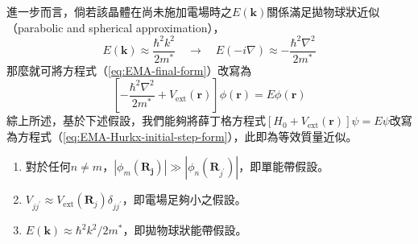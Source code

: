 進一步而言，倘若該晶體在尚未施加電場時之$E(\mathbf{k})$關係滿足拋物球狀近似（parabolic and spherical approximation），
\begin{equation}
E(\mathbf{k})\approx\frac{\hbar^2k^2}{2m^*}\quad\to\quad E(-i\nabla)\approx-\frac{\hbar^2\nabla^2}{2m^*}
\end{equation}
那麼就可將方程式（\ref{eq:EMA-final-form}）改寫為
\begin{equation}
\label{eq:EMA-Hurkx-initial-step-form}
\left[-\frac{\hbar^2\nabla^2}{2m^*}+V_\text{ext}(\mathbf{r})\right]\phi(\mathbf{r})=E\phi(\mathbf{r})
\end{equation}
\hspace{2em}綜上所述，基於下述假設，我們能夠將薛丁格方程式$[H_0+V_\text{ext}(\mathbf{r})]\psi=E\psi$改寫為方程式（\ref{eq:EMA-Hurkx-initial-step-form}），此即為等效質量近似。
\begin{enumerate}
	\item 對於任何$n\neq m$，$\left\vert\phi_m(\mathbf{R_j})\right\vert\gg\left\vert\phi_n(\mathbf{R}_{j^\prime})\right\vert$，即單能帶假設。
	\item $V_{jj^\prime}\approx V_\text{ext}(\mathbf{R}_j)\delta_{jj^\prime}$，即電場足夠小之假設。
	\item $E(\mathbf{k})\approx\hbar^2k^2/2m^*$，即拋物球狀能帶假設。
\end{enumerate}
